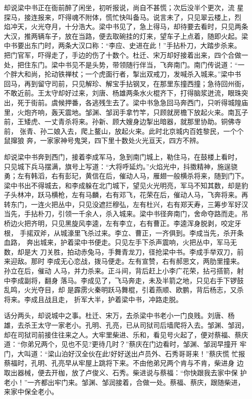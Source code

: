 却说梁中书正在衙前醉了闲坐，初听报说，尚自不甚慌；次后没半个更次，流
星探马，接连报来，吓得魂不附体，慌忙快叫备马。说言未了，只见翠云楼上，烈
焰冲天，火光夺月，十分浩大。梁中书见了，急上得马，却待要去看时，只见两条
大汉，推两辆车子，放在当路，便去取碗挂的灯来，望车子上点着，随即火起。梁
中书要出东门时，两条大汉口称：“李应、史进在此！”手拈朴刀，大踏步杀来。
把门官军，吓得走了，手边的伤了十数个。杜迁、宋万却好接着出来，四个合做一
处，把住东门。梁中书见不是头势，带领随行伴当，飞奔南门。南门传说道：“一
个胖大和尚，抡动铁禅杖；一个虎面行者，掣出双戒刀，发喊杀入城来。”梁中书
回马，再到留守司前，只见解珍、解宝手拈钢叉，在那里东撞西撞；急待回州衙，
不敢近前。王太守却好过来，刘唐、杨雄两条水火棍齐下，打得脑浆迸流，眼珠突
出，死于街前。虞候押番，各逃残生去了。梁中书急急回马奔西门，只听得城隍庙
里，火炮齐响，轰天震地。邹渊、邹润手拿竹竿，只顾就房檐下放起火来。南瓦子
前，王矮虎、一丈青杀将来。孙新、顾大嫂身边掣出暗器，就那里协助。铜佛寺前，
张青、孙二娘入去，爬上鳌山，放起火来。此时北京城内百姓黎民，一个个鼠撺狼
奔，一家家神号鬼哭，四下里十数处火光亘天，四方不辨。

却说梁中书奔到西门，接着李成军马，急到南门城上，勒住马，在鼓楼上看时，
只见城下兵马摆满，旗号上写道：“大将呼延灼。”火焰光中，抖擞精神，施逞骁
勇；左有韩滔，右有彭玘，黄信在后，催动人马，雁翅一般横杀将来，随到门下。
梁中书出不得城去，和李成躲在北门城下，望见火光明亮，军马不知其数，却是豹
子头林冲，跃马横枪，左有马麟，右有邓飞，花荣在后，催动人马，飞奔将来。再
转东门，一连火把丛中，只见没遮拦穆弘，左有杜兴，右有郑天寿，三筹步军好汉
当先，手拈朴刀，引领一千余人，杀入城来。梁中书径奔南门，舍命夺路而走。吊
桥边火把齐明，只见黑旋风李逵，左有李立，右有曹正。李逵浑身脱剥，咬定牙根，
手掿双斧，从城濠里飞杀过来。李立、曹正，一齐俱到。李成当先，杀开条血路，
奔出城来，护着梁中书便走。只见左手下杀声震响，火把丛中，军马无数，却是大
刀关胜，拍动赤兔马，手舞青龙刀，径抢梁中书。李成手举双刀，前来迎敌。那时
李成无心恋战，拨马便走。左有宣赞，右有郝思文，两肋里撞来。孙立在后，催动
人马，并力杀来。正斗间，背后赶上小李广花荣，拈弓搭箭，射中李成副将，翻身
落马。李成见了，飞马奔走，未及半箭之地，只见右手下锣鼓乱鸣，火光夺目，却
是霹雳火秦明跃马舞棍，引着燕顺、欧鹏，背后杨志，又杀将来。李成且战且走，
折军大半，护着梁中书，冲路走脱。

话分两头，却说城中之事。杜迁、宋万，去杀梁中书老小一门良贱。刘唐、杨
雄，去杀王太守一家老小。孔明、孔亮，已从司狱司后墙爬将入去。邹渊、邹润，
却在司狱司前接住往来之人。大牢里柴进、乐和，看见号火起了，便对蔡福、蔡庆
道：“你弟兄两个，见也不见?更待几时？”蔡庆在门边看时，邹渊、邹润早撞开
牢门，大叫道：“梁山泊好汉全伙在此!好好送出卢员外、石秀哥哥来！”蔡庆慌
忙报蔡福时，孔明、孔亮早从牢屋上跳将下来。不由他弟兄两个肯与不肯，柴进身
边取出器械，便去开枷，放了卢俊义、石秀。柴进说与蔡福：“你快跟我去家中保
护老小！”一齐都出牢门来。邹渊、邹润接着，合做一处。蔡福、蔡庆，跟随柴进，
来家中保全老小。

